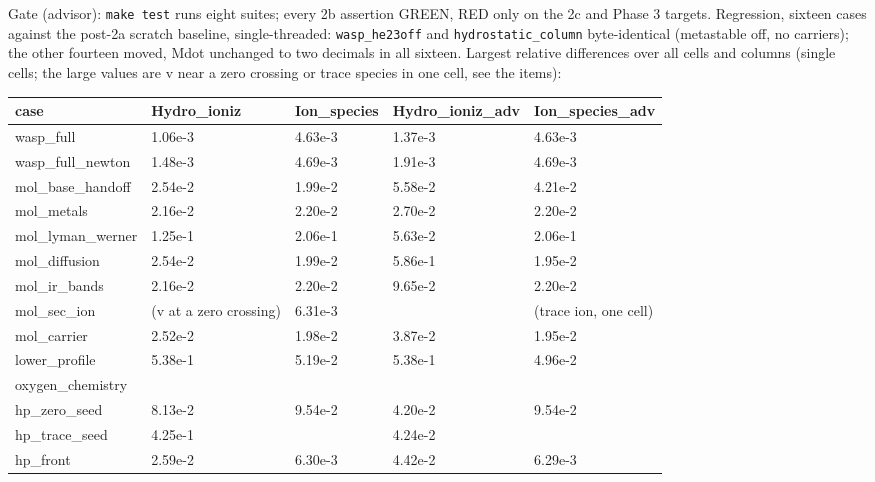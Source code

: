 \documentclass[english,a4paper]{my_memo}
\begin{document}
Gate (advisor): \texttt{make\ test} runs eight suites; every 2b assertion GREEN,
RED only on the 2c and Phase 3 targets. Regression, sixteen cases against
the post-2a scratch baseline, single-threaded: \texttt{wasp\_he23off} and
\texttt{hydrostatic\_column} byte-identical (metastable off, no carriers); the other
fourteen moved, Mdot unchanged to two decimals in all sixteen. Largest
relative differences over all cells and columns (single cells; the large
values are v near a zero crossing or trace species in one cell, see the
items):

{\def\LTcaptype{none} %
{\small
\begin{longtable}[]{@{}>{\raggedright\arraybackslash}p{\dimexpr(\linewidth-10\tabcolsep)/5\relax}>{\raggedright\arraybackslash}p{\dimexpr(\linewidth-10\tabcolsep)/5\relax}>{\raggedright\arraybackslash}p{\dimexpr(\linewidth-10\tabcolsep)/5\relax}>{\raggedright\arraybackslash}p{\dimexpr(\linewidth-10\tabcolsep)/5\relax}>{\raggedright\arraybackslash}p{\dimexpr(\linewidth-10\tabcolsep)/5\relax}@{}}
\toprule\noalign{}
case & Hydro\_ioniz & Ion\_species & Hydro\_ioniz\_adv & Ion\_species\_adv \\
\midrule\noalign{}
\endhead
\bottomrule\noalign{}
\endlastfoot
wasp\_full & 1.06e-3 & 4.63e-3 & 1.37e-3 & 4.63e-3 \\
wasp\_full\_newton & 1.48e-3 & 4.69e-3 & 1.91e-3 & 4.69e-3 \\
mol\_base\_handoff & 2.54e-2 & 1.99e-2 & 5.58e-2 & 4.21e-2 \\
mol\_metals & 2.16e-2 & 2.20e-2 & 2.70e-2 & 2.20e-2 \\
mol\_lyman\_werner & 1.25e-1 & 2.06e-1 & 5.63e-2 & 2.06e-1 \\
mol\_diffusion & 2.54e-2 & 1.99e-2 & 5.86e-1 & 1.95e-2 \\
mol\_ir\_bands & 2.16e-2 & 2.20e-2 & 9.65e-2 & 2.20e-2 \\
mol\_sec\_ion & 1.70 (v at a zero crossing) & 6.31e-3 & 1.70 & 1.0 (trace ion, one cell) \\
mol\_carrier & 2.52e-2 & 1.98e-2 & 3.87e-2 & 1.95e-2 \\
lower\_profile & 5.38e-1 & 5.19e-2 & 5.38e-1 & 4.96e-2 \\
oxygen\_chemistry & 1.94 & 1.0 & 1.94 & 1.0 \\
hp\_zero\_seed & 8.13e-2 & 9.54e-2 & 4.20e-2 & 9.54e-2 \\
hp\_trace\_seed & 4.25e-1 & 1.0 & 4.24e-2 & 1.0 \\
hp\_front & 2.59e-2 & 6.30e-3 & 4.42e-2 & 6.29e-3 \\
\end{longtable}
}
}
\end{document}

